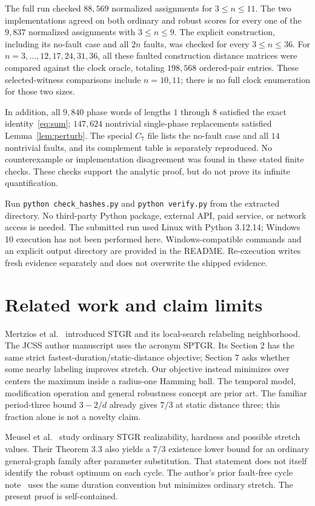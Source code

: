 \documentclass[11pt,a4paper]{article}
\begin{document}
The full run checked $88{,}569$ normalized assignments for $3\le n\le11$. The two implementations agreed on both ordinary and robust scores for every one of the $9{,}837$ normalized assignments with $3\le n\le9$. The explicit construction, including its no-fault case and all $2n$ faults, was checked for every $3\le n\le36$. For $n=3,\ldots,12,17,24,31,36$, all these faulted construction distance matrices were compared against the clock oracle, totaling $198{,}568$ ordered-pair entries. These selected-witness comparisons include $n=10,11$; there is no full clock enumeration for those two sizes.

In addition, all $9{,}840$ phase words of lengths $1$ through $8$ satisfied the exact identity~\eqref{eq:sum}; $147{,}624$ nontrivial single-phase replacements satisfied Lemma~\ref{lem:perturb}. The special $C_7$ file lists the no-fault case and all $14$ nontrivial faults, and its complement table is separately reproduced. No counterexample or implementation disagreement was found in these stated finite checks. These checks support the analytic proof, but do not prove its infinite quantification.

Run \texttt{python check\_hashes.py} and \texttt{python verify.py} from the extracted directory. No third-party Python package, external API, paid service, or network access is needed. The submitted run used Linux with Python 3.12.14; Windows 10 execution has not been performed here. Windows-compatible commands and an explicit output directory are provided in the README. Re-execution writes fresh evidence separately and does not overwrite the shipped evidence.

\section{Related work and claim limits}
Mertzios et al.~\cite{mertzios} introduced STGR and its local-search relabeling neighborhood. The JCSS author manuscript uses the acronym SPTGR. Its Section 2 has the same strict fastest-duration/static-distance objective; Section 7 asks whether some nearby labeling improves stretch. Our objective instead minimizes over centers the maximum inside a radius-one Hamming ball. The temporal model, modification operation and general robustness concept are prior art. The familiar period-three bound $3-2/d$ already gives $7/3$ at static distance three; this fraction alone is not a novelty claim.

Meusel et al.~\cite{meusel} study ordinary STGR realizability, hardness and possible stretch values. Their Theorem 3.3 also yields a $7/3$ existence lower bound for an ordinary general-graph family after parameter substitution. That statement does not itself identify the robust optimum on each cycle. The author's prior fault-free cycle note~\cite{yonezu27} uses the same duration convention but minimizes ordinary stretch. The present proof is self-contained.
\end{document}
